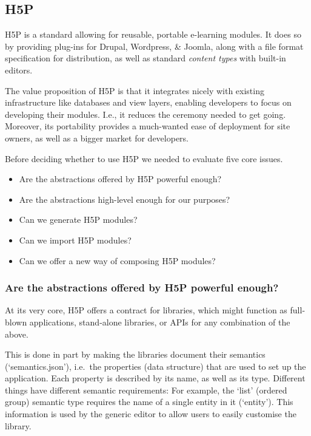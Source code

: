 \subsection{H5P}

H5P is a standard allowing for reusable, portable e-learning modules. It does 
so by providing plug-ins for Drupal, Wordpress, \& Joomla, along with a file 
format specification for distribution, as well as standard \textit{content 
types} with built-in editors.

The value proposition of H5P is that it integrates nicely with existing
infrastructure like databases and view layers, enabling developers to focus on
developing their modules.\cite{h5pwhy} I.e., it reduces the ceremony needed
to get going. Moreover, its portability provides a much-wanted ease of
deployment for site owners, as well as a bigger market for developers.

Before deciding whether to use H5P we needed to evaluate five core issues.

\begin{itemize}
\item Are the abstractions offered by H5P powerful enough?
\item Are the abstractions high-level enough for our purposes?
\item Can we generate H5P modules?
\item Can we import H5P modules?
\item Can we offer a new way of composing H5P modules?
\end{itemize}

\subsubsection{Are the abstractions offered by H5P powerful enough?}

At its very core, H5P offers a contract for libraries, which might function as
full-blown applications, stand-alone libraries, or APIs for any combination of
the above. 

This is done in part by making the libraries document their semantics
(`semantics.json'), i.e.\ the properties (data structure) that are used to set
up the application. Each property is described by its name, as well as its type.
Different things have different semantic requirements: For example, the
`list' (ordered group) semantic type requires the name of a single entity in it
(`entity'). This information is used by the generic editor to allow users to
easily customise the library.

